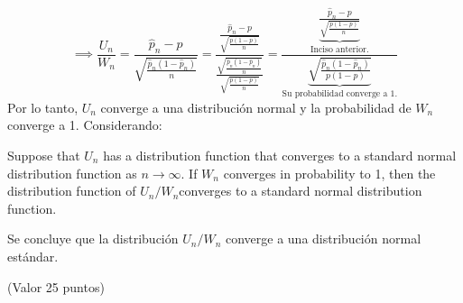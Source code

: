 \begin{enumerate}
\begin{solution}
	$$\implies \frac{U_n}{W_n}=\frac{\hat{p}_n-p}{\sqrt{\frac{\hat{p}_n(1-\hat{p}_n)}{n}}}=\frac{\frac{\hat{p}_n-p}{\sqrt{\frac{p(1-p)}{n}}}}{\frac{\sqrt{\frac{\hat{p}_n(1-\hat{p}_n)}{n}}}{\sqrt{\frac{p(1-p)}{n}}}}=\frac{\underbrace{\frac{\hat{p}_n-p}{\sqrt{\frac{p(1-p)}{n}}}}_{\text{Inciso anterior.}}}{\underbrace{\sqrt{\frac{\hat{p}_n(1-\hat{p}_n)}{p(1-p)}}}_{\text{Su probabilidad converge a 1.}}}$$
	Por lo tanto, $U_n$ converge a una distribución normal y la probabilidad  de $W_n$  converge a 1. Considerando: \begin{tcolorbox}[colback=gray!15,colframe=black!1!black,title=Teorema 9.3]
		Suppose that $U_n$ has a distribution function that converges to a standard normal distribution function as $n \to \infty$. If $W_n$ converges in probability to 1, then the distribution function of $U_n / W_n $converges to a standard normal distribution function.
	\end{tcolorbox}

Se concluye que la distribución $U_n/W_n$ converge a una distribución normal estándar.
 	\end{solution}
\end{enumerate}
(Valor 25 puntos)
